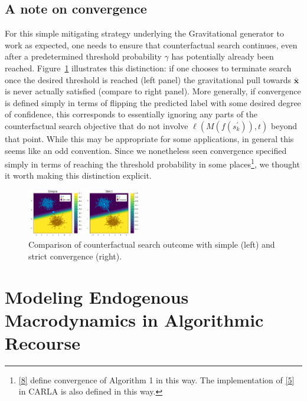 \documentclass[
  conference]{IEEEtran}
\begin{document}
\hypertarget{a-note-on-convergence}{%
\subsection{A note on convergence}\label{a-note-on-convergence}}

For this simple mitigating strategy underlying the Gravitational
generator to work as expected, one needs to ensure that counterfactual
search continues, even after a predetermined threshold probability
\(\gamma\) has potentially already been reached.
Figure~\ref{fig-convergence} illustrates this distinction: if one
chooses to terminate search once the desired threshold is reached (left
panel) the gravitational pull towards \(\bar{\mathbf{x}}\) is never
actually satisfied (compare to right panel). More generally, if
convergence is defined simply in terms of flipping the predicted label
with some desired degree of confidence, this corresponds to essentially
ignoring any parts of the counterfactual search objective that do not
involve \(\ell(M(f(s_k^\prime)),t)\) beyond that point. While this may
be appropriate for some applications, in general this seems like an odd
convention. Since we nonetheless seen convergence specified simply in
terms of reaching the threshold probability in some places\footnote{\protect\hyperlink{ref-joshi2019towards}{{[}8{]}}
  define convergence of Algorithm 1 in this way. The implementation of
  \protect\hyperlink{ref-wachter2017counterfactual}{{[}5{]}} in CARLA is
  also defined in this way.}, we thought it worth making this
distinction explicit.

\begin{figure}

{\centering \includegraphics[width=0.45\textwidth,height=\textheight]{www/gravitational_generator_comparison.png}

}

\caption{\label{fig-convergence}Comparison of counterfactual search
outcome with simple (left) and strict convergence (right).}

\end{figure}

\hypertarget{sec-method-2}{%
\section{Modeling Endogenous Macrodynamics in Algorithmic
Recourse}\label{sec-method-2}}
\end{document}
